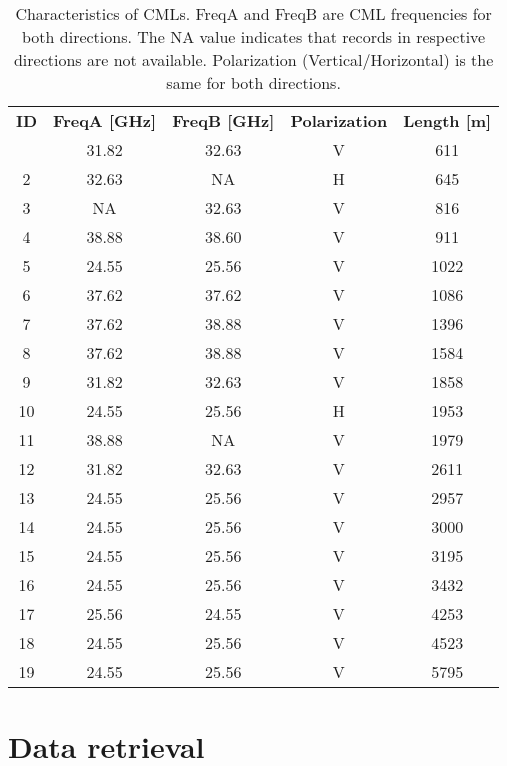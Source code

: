 \documentclass{ctuthesis}\usepackage[]{graphicx}\usepackage[]{color}
\begin{document}
\begin{table}[p]
\begin{ctucolortab}
\centering
\begin{tabular}{ c | c  c  c  c }
	\bfseries ID    &       \textbf{FreqA [GHz]}   &  \bfseries FreqB [GHz]  &  \bfseries  Polarization  & \bfseries Length [m]   \\ \Midrule
        1  &	31.82 &	32.63 &	V  &	611     \\
        2  &	32.63 &	NA    &	H  &	645     \\
        3  &	NA    &	32.63 &	V  &	816     \\      
        4  &	38.88 &	38.60 &	V  &	911     \\
        5  &	24.55 &	25.56 &	V  &	1022    \\
        6  &	37.62 &	37.62 &	V  &	1086    \\         
        7  &	37.62 &	38.88 &	V  &	1396    \\
        8  &	37.62 &	38.88 &	V  &	1584    \\
        9  &	31.82 &	32.63 &	V  &	1858    \\
        10  &	24.55 &	25.56 &	H  &	1953    \\
        11  &	38.88 &	NA    &	V  &	1979    \\
        12  &	31.82 &	32.63 &	V  &	2611    \\
        13  &	24.55 &	25.56 &	V  &	2957    \\
        14  &	24.55 &	25.56 &	V  &	3000    \\
        15  &	24.55 &	25.56 &	V  &	3195    \\
        16  &	24.55 &	25.56 &	V  &	3432    \\
        17  &	25.56 &	24.55 &	V  &	4253    \\
        18  &	24.55 &	25.56 &	V  &	4523    \\
        19  &	24.55 &	25.56 &	V  &	5795
\end{tabular}
\caption{Characteristics of CMLs. FreqA and FreqB are CML frequencies for both directions. The NA value indicates that records in respective directions are not available. Polarization (Vertical/Horizontal) is the same for both directions.}
\label{2tab1}
\end{ctucolortab}
\end{table}
 
 
\section{Data retrieval} \label{DatRet}
\end{document}
